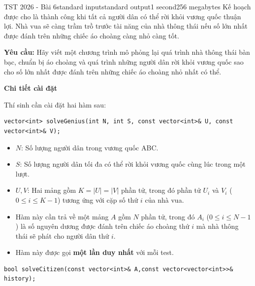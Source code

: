 \begin{problem}{TST 2026 - Bài 6}{standard input}{standard output}{1 second}{256 megabytes}
Kế hoạch được cho là thành công khi tất cả người dân có thể rời khỏi vương quốc thuận lợi. Nhà vua sẽ càng trầm trồ trước tài năng của nhà thông thái nếu số lớn nhất được đánh trên những chiếc áo choàng càng nhỏ càng tốt.

\textbf{Yêu cầu:} Hãy viết một chương trình mô phỏng lại quá trình nhà thông thái bàn bạc, chuẩn bị áo choàng và quá trình những người dân rời khỏi vương quốc sao cho số lớn nhất được đánh trên những chiếc áo choàng nhỏ nhất có thể.

\InputFile
\textbf{Chi tiết cài đặt}

Thí sinh cần cài đặt hai hàm sau:

\begin{lstlisting}
vector<int> solveGenius(int N, int S, const vector<int>& U, const vector<int>& V);
\end{lstlisting}

\begin{itemize}
   \item $N$: Số lượng người dân trong vương quốc ABC.
   \item $S$: Số lượng người dân tối đa có thể rời khỏi vương quốc cùng lúc trong một lượt.
   \item $U,V$: Hai mảng gồm $K=|U|=|V|$ phần tử, trong đó phần tử $U_i$ và $V_i$ ($0\le i\le K-1$) tương ứng với cặp số thứ $i$ của nhà vua.
   \item Hàm này cần trả về một mảng $A$ gồm $N$ phần tử, trong đó $A_i$ ($0\le i\le N-1$) là số nguyên dương được đánh trên chiếc áo choàng thứ $i$ mà nhà thông thái sẽ phát cho người dân thứ $i$.
   \item Hàm này được gọi \textbf{một lần duy nhất} với mỗi test.
\end{itemize}

\begin{lstlisting}
bool solveCitizen(const vector<int>& A,const vector<vector<int>>& history);
\end{lstlisting}


\end{problem}
